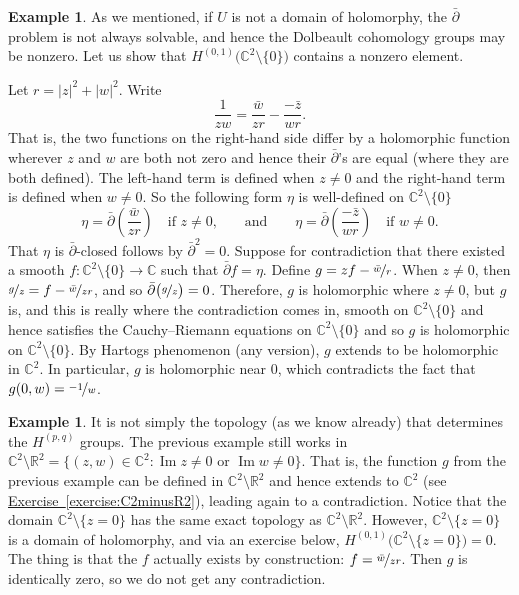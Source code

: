 \documentclass[12pt,openany]{book}
\renewcommand{\Im}{\operatorname{Im}}
\newcommand{\sabs}[1]{\lvert {#1} \rvert}
\newcommand{\C}{{\mathbb{C}}}
\newcommand{\R}{{\mathbb{R}}}
\theoremstyle{plain}
\theoremstyle{remark}
\theoremstyle{definition}
\theoremstyle{exercise}
\theoremstyle{example}
\newtheorem{example}[thm]{Example}
\newcommand{\exerciseref}[1]{\hyperref[#1]{Exercise~\ref*{#1}}}
\begin{document}
\begin{example}
As we mentioned, if $U$ is not a domain of holomorphy, the $\bar{\partial}$
problem is not always solvable, and hence the Dolbeault cohomology groups
may be nonzero.  Let us show that
$H^{(0,1)}\bigl(\C^2 \setminus \{ 0 \}\bigr)$ contains a nonzero element.

Let $r = \sabs{z}^2+\sabs{w}^2$.  Write
\begin{equation*}
\frac{1}{zw} = \frac{\bar{w}}{z r} - \frac{-\bar{z}}{w r} .
\end{equation*}
That is, the two functions on the right-hand side differ by a holomorphic
function wherever $z$ and $w$ are both not zero and hence their
$\bar{\partial}$'s are equal (where they are both defined).  The left-hand
term is defined when $z \neq 0$ and the right-hand term is defined when
$w \neq 0$.
So the following form $\eta$ is well-defined on $\C^2 \setminus \{ 0 \}$
\begin{equation*}
\eta =
\bar{\partial}
\left(
\dfrac{\bar{w}}{z r}
\right)
\quad \text{if $z \neq 0$,}
\qquad \text{and} \qquad
\eta =
\bar{\partial}
\left(
\dfrac{-\bar{z}}{w r}
\right)
\quad \text{if $w \neq 0$} .
\end{equation*}
That $\eta$ is $\bar{\partial}$-closed follows by $\bar{\partial}^2 = 0$.
Suppose for contradiction that there existed a smooth
$f \colon \C^2 \setminus \{ 0 \} \to \C$
such that $\bar{\partial} f = \eta$.
Define $g = z f - \nicefrac{\bar{w}}{r}$.  When $z \neq 0$, then
$\nicefrac{g}{z} = f - \nicefrac{\bar{w}}{zr}$, and so
$\bar{\partial}\bigl(\nicefrac{g}{z}\bigr) = 0$.  Therefore, $g$ is holomorphic
where $z \neq 0$, but $g$ is, and this is really where the contradiction
comes in, smooth on $\C^2 \setminus \{ 0 \}$ and hence satisfies the
Cauchy--Riemann equations on $\C^2 \setminus \{ 0 \}$ and so $g$ is holomorphic
on $\C^2 \setminus \{ 0 \}$.
By Hartogs phenomenon (any version), $g$ extends to be holomorphic in $\C^2$.
In particular, $g$ is holomorphic near $0$,
which contradicts the fact that $g(0,w) = \nicefrac{-1}{w}$.
\end{example}

\begin{example}
It is not simply the topology (as we know already) that determines the
$H^{(p,q)}$ groups.  The previous example still works in $\C^2 \setminus
\R^2 = \bigl\{ (z,w) \in \C^2 :
\Im z \neq 0 \text{ or } \Im w \neq 0 \bigr\}$.
That is, the function $g$ from the previous example can be defined in
$\C^2 \setminus \R^2$ and hence extends to $\C^2$
(see \exerciseref{exercise:C2minusR2}),
leading again to a contradiction.
Notice that the domain
$\C^2 \setminus \{ z = 0\}$
has the same exact topology as $\C^2 \setminus \R^2$.
However,
$\C^2 \setminus \{ z = 0\}$
is a domain of holomorphy, and via an exercise below,
$H^{(0,1)}\bigl(\C^2 \setminus \{ z = 0\}\bigr) = 0$.
The thing is that the $f$ actually exists
by construction: $f = \nicefrac{\bar{w}}{z r}$.  Then $g$ is identically
zero, so we do not get any contradiction.
\end{example}
\end{document}
